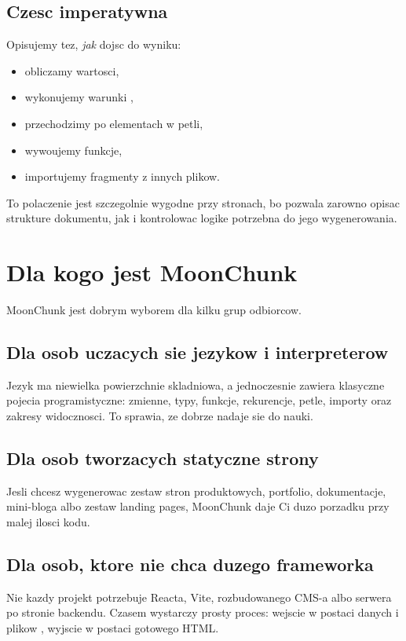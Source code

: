 \subsection*{Czesc imperatywna}
Opisujemy tez, \emph{jak} dojsc do wyniku:

\begin{itemize}
  \item obliczamy wartosci,
  \item wykonujemy warunki ,
  \item przechodzimy po elementach w petli,
  \item wywoujemy funkcje,
  \item importujemy fragmenty z innych plikow.
\end{itemize}

To polaczenie jest szczegolnie wygodne przy stronach, bo pozwala zarowno opisac
strukture dokumentu, jak i kontrolowac logike potrzebna do jego wygenerowania.

\section{Dla kogo jest MoonChunk}
MoonChunk jest dobrym wyborem dla kilku grup odbiorcow.

\subsection*{Dla osob uczacych sie jezykow i interpreterow}
Jezyk ma niewielka powierzchnie skladniowa, a jednoczesnie zawiera klasyczne
pojecia programistyczne: zmienne, typy, funkcje, rekurencje, petle, importy oraz
zakresy widocznosci. To sprawia, ze dobrze nadaje sie do nauki.

\subsection*{Dla osob tworzacych statyczne strony}
Jesli chcesz wygenerowac zestaw stron produktowych, portfolio, dokumentacje,
mini-bloga albo zestaw landing pages, MoonChunk daje Ci duzo porzadku przy malej
ilosci kodu.

\subsection*{Dla osob, ktore nie chca duzego frameworka}
Nie kazdy projekt potrzebuje Reacta, Vite, rozbudowanego CMS-a albo serwera po
stronie backendu. Czasem wystarczy prosty proces: wejscie w postaci danych i plikow
, wyjscie w postaci gotowego HTML.

